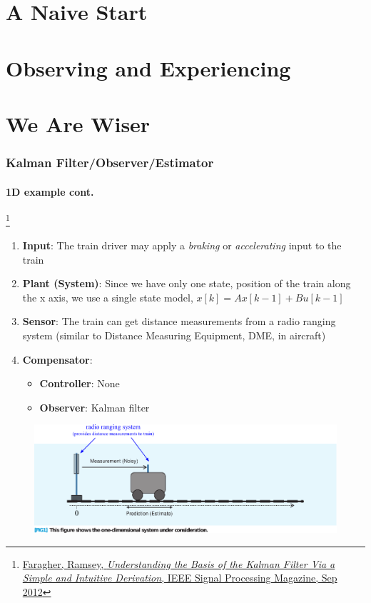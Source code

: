 \section{A Naive Start}



\section{Observing and Experiencing}


\section{We Are Wiser}

\begin{frame}[plain]
\frametitle{Kalman Filter/Observer/Estimator}
\framesubtitle{1D example \tiny cont.}

\footnote{\tiny\hspace{-0.23in} \href{http://www.cl.cam.ac.uk/~rmf25/papers/Understanding the Basis of the Kalman Filter.pdf}{Faragher, Ramsey, \emph{Understanding the Basis of the Kalman Filter Via a Simple and Intuitive Derivation}, IEEE Signal Processing Magazine, Sep 2012}}
\scriptsize
\begin{changemargin}{-1.3in}{0in}
\begin{enumerate}\scriptsize
\item \textbf{Input}: The train driver may apply a \emph{braking} or \emph{accelerating} input to the train
\item \textbf{Plant (System)}: Since we have only one state, position of the train along the x axis, we use a single state model, $x[k]=Ax[k-1]+Bu[k-1]$
\item \textbf{Sensor}: The train can get distance measurements from a radio ranging system (similar to Distance Measuring Equipment, DME, in aircraft)
\item \textbf{Compensator}:
\begin{itemize}\scriptsize
\item \textbf{Controller}: None 
\item \textbf{Observer}: Kalman filter
\end{itemize}
\end{enumerate}
\begin{figure}[h]
\centering
\includegraphics[width=1.35\textwidth]{figs/2012_MAG_Understanding_the_Basis_of_the_Kalman_Filter_fig1.pdf}
\end{figure}
\end{changemargin}
\end{frame}









